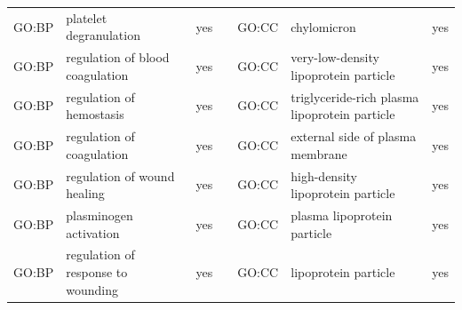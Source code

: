 \begin{longtable}{@{}lp{4cm}lllp{4cm}l@{}}
GO:BP           & platelet degranulation                                                                                                             & yes              &           & GO:CC           & chylomicron                                                                                                                                                            & yes              \\
GO:BP           & regulation of blood coagulation                                                                                                    & yes              &           & GO:CC           & very-low-density lipoprotein particle                                                                                                                                  & yes              \\
GO:BP           & regulation of hemostasis                                                                                                           & yes              &           & GO:CC           & triglyceride-rich plasma lipoprotein particle                                                                                                                          & yes              \\
GO:BP           & regulation of coagulation                                                                                                          & yes              &           & GO:CC           & external side of plasma membrane                                                                                                                                       & yes              \\
GO:BP           & regulation of wound healing                                                                                                        & yes              &           & GO:CC           & high-density lipoprotein particle                                                                                                                                      & yes              \\
GO:BP           & plasminogen activation                                                                                                             & yes              &           & GO:CC           & plasma lipoprotein particle                                                                                                                                            & yes              \\
GO:BP           & regulation of response to wounding                                                                                                 & yes              &           & GO:CC           & lipoprotein particle                                                                                                                                                   & yes              \\

\end{longtable}
